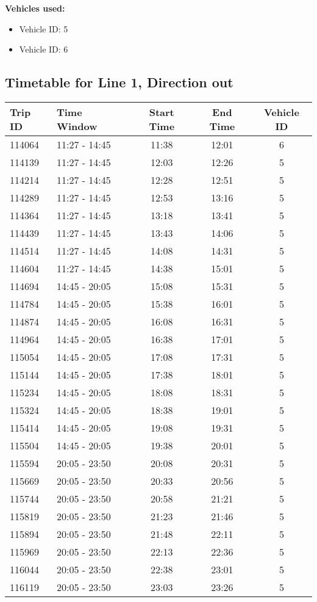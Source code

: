 \documentclass{article}
\begin{document}
\textbf{Vehicles used:}
\begin{itemize}
  \item Vehicle ID: 5
  \item Vehicle ID: 6
\end{itemize}

\subsection*{Timetable for Line 1, Direction out}
\begin{tabular}{llccc}
\toprule
Trip ID & Time Window & Start Time & End Time & Vehicle ID \\
\midrule
114064 & 11:27 - 14:45 & 11:38 & 12:01 & 6 \\
114139 & 11:27 - 14:45 & 12:03 & 12:26 & 5 \\
114214 & 11:27 - 14:45 & 12:28 & 12:51 & 5 \\
114289 & 11:27 - 14:45 & 12:53 & 13:16 & 5 \\
114364 & 11:27 - 14:45 & 13:18 & 13:41 & 5 \\
114439 & 11:27 - 14:45 & 13:43 & 14:06 & 5 \\
114514 & 11:27 - 14:45 & 14:08 & 14:31 & 5 \\
114604 & 11:27 - 14:45 & 14:38 & 15:01 & 5 \\
114694 & 14:45 - 20:05 & 15:08 & 15:31 & 5 \\
114784 & 14:45 - 20:05 & 15:38 & 16:01 & 5 \\
114874 & 14:45 - 20:05 & 16:08 & 16:31 & 5 \\
114964 & 14:45 - 20:05 & 16:38 & 17:01 & 5 \\
115054 & 14:45 - 20:05 & 17:08 & 17:31 & 5 \\
115144 & 14:45 - 20:05 & 17:38 & 18:01 & 5 \\
115234 & 14:45 - 20:05 & 18:08 & 18:31 & 5 \\
115324 & 14:45 - 20:05 & 18:38 & 19:01 & 5 \\
115414 & 14:45 - 20:05 & 19:08 & 19:31 & 5 \\
115504 & 14:45 - 20:05 & 19:38 & 20:01 & 5 \\
115594 & 20:05 - 23:50 & 20:08 & 20:31 & 5 \\
115669 & 20:05 - 23:50 & 20:33 & 20:56 & 5 \\
115744 & 20:05 - 23:50 & 20:58 & 21:21 & 5 \\
115819 & 20:05 - 23:50 & 21:23 & 21:46 & 5 \\
115894 & 20:05 - 23:50 & 21:48 & 22:11 & 5 \\
115969 & 20:05 - 23:50 & 22:13 & 22:36 & 5 \\
116044 & 20:05 - 23:50 & 22:38 & 23:01 & 5 \\
116119 & 20:05 - 23:50 & 23:03 & 23:26 & 5 \\
\bottomrule
\end{tabular}
\end{document}
